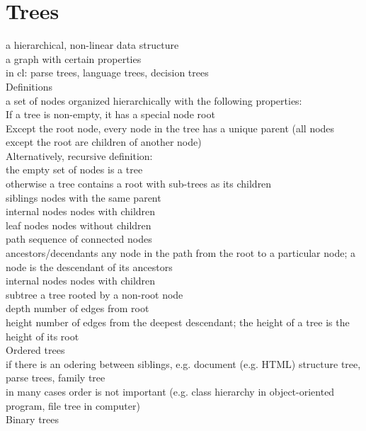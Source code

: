 \section{Trees}
{\tiny a hierarchical, non-linear data structure \\
a graph with certain properties\\
in cl: parse trees, language trees, decision trees}\\
\scriptsize{Definitions}\\ {\tiny a set of nodes organized hierarchically with the following properties: \\
If a tree is non-empty, it has a special node root\\
Except the root node, every node in the tree has a unique parent (all nodes except the root are children of another node)\\
Alternatively, recursive definition:\\
the empty set of nodes is a tree\\
otherwise a tree contains a root with sub-trees as its children}\\
\scriptsize{siblings} {\tiny nodes with the same parent
}\\
\scriptsize{internal nodes} {\tiny nodes with children
}\\
\scriptsize{leaf nodes} {\tiny nodes without children
}\\
\scriptsize{path} {\tiny sequence of connected nodes
}\\
\scriptsize{ancestors/decendants} {\tiny any node in the path from the root to a particular node; a node is the descendant of its ancestors
}\\
\scriptsize{internal nodes} {\tiny nodes with children
}\\
\scriptsize{subtree} {\tiny a tree rooted by a non-root node
}\\
\scriptsize{depth} {\tiny number of edges from root
}\\
\scriptsize{height} {\tiny number of edges from the deepest descendant; the height of a tree is the height of its root
}\\
\scriptsize{Ordered trees}\\ 
{\tiny if there is an odering between siblings, e.g. document (e.g. HTML) structure tree, parse trees, family tree\\
in many cases order is not important (e.g. class hierarchy in object-oriented program, file tree in computer)
}\\
\scriptsize{Binary trees}\\

